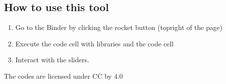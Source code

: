 \documentclass[letterpaper,10pt,english]{jupyterBook}
\begin{document}
\sphinxAtStartPar
{}


\subsection{How to use this tool}
\label{\detokenize{content/tools/1D_ditchflow:how-to-use-this-tool}}\begin{enumerate}
%
\item {} 
\sphinxAtStartPar
Go to the Binder by clicking the rocket button (top\sphinxhyphen{}right of the page)

\item {} 
\sphinxAtStartPar
Execute the code cell with libraries and the code cell

\item {} 
\sphinxAtStartPar
Interact with the sliders.

\end{enumerate}

\sphinxAtStartPar
The codes are licensed under CC by 4.0 
\end{document}
